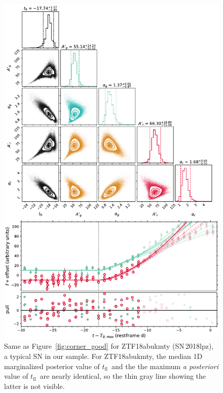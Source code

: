 \documentclass[twocolumn]{./aastex63}
\newcommand{\tfl}{$t_\mathrm{fl}$}
\begin{document}
\begin{figure}
    \centering
    \includegraphics[width=5.2in]{./figures/Fig2.pdf}
    \caption{Same as Figure~\ref{fig:corner_good} for ZTF18abukmty
    (SN\,2018lpz), a typical SN in our sample. For ZTF18abukmty, the median 1D
    marginalized posterior value of \tfl\ and the the maximum \textit{a
    posteriori} value of \tfl\ are nearly identical, so the thin gray line
    showing the latter is not visible.}
    \label{fig:corner_median}
\end{figure}
\end{document}

